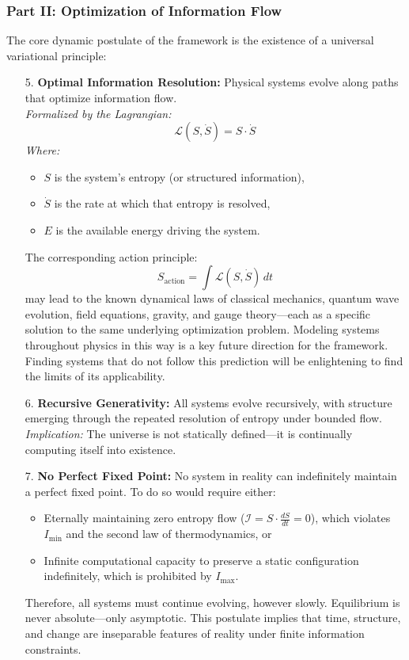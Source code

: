 \documentclass[12pt]{article}
\begin{document}
\subsubsection{Part II: Optimization of Information Flow}

The core dynamic postulate of the framework is the existence of a universal variational principle:

\begin{enumerate}
    \item[5.] \textbf{Optimal Information Resolution:}  
    Physical systems evolve along paths that optimize information flow.\\
    \textit{Formalized by the Lagrangian:}
    \[
    \mathcal{L}(S, \dot{S}) = S \cdot \dot{S}
    \]
    \textit{Where:}
    \begin{itemize}
        \item \( S \) is the system’s entropy (or structured information),
        \item \( \dot{S} \) is the rate at which that entropy is resolved,
        \item \( E \) is the available energy driving the system.
    \end{itemize}

    The corresponding action principle:
    \[
    S_{\text{action}} = \int \mathcal{L}(S, \dot{S}) \, dt
    \]
    may lead to the known dynamical laws of classical mechanics, quantum wave evolution, field equations, gravity, and gauge theory—each as a specific solution to the same underlying optimization problem. Modeling systems throughout physics in this way is a key future direction for the framework. Finding systems that do not follow this prediction will be enlightening to find the limits of its applicability.

    \item[6.] \textbf{Recursive Generativity:}  
    All systems evolve recursively, with structure emerging through the repeated resolution of entropy under bounded flow.\\
    \textit{Implication:} The universe is not statically defined—it is continually computing itself into existence.

    
    \item[7.] \textbf{No Perfect Fixed Point:}  
    No system in reality can indefinitely maintain a perfect fixed point.  
    To do so would require either:
    \begin{itemize}
        \item Eternally maintaining zero entropy flow (\( \mathcal{I} = S \cdot \frac{dS}{dt} = 0 \)), which violates $I_\text{min}$ and the second law of thermodynamics, or
        \item Infinite computational capacity to preserve a static configuration indefinitely, which is prohibited by $I_\text{max}$.
    \end{itemize}
    Therefore, all systems must continue evolving, however slowly.  
    Equilibrium is never absolute—only asymptotic.  
    This postulate implies that time, structure, and change are inseparable features of reality under finite information constraints.
    
\end{enumerate}
\end{document}
